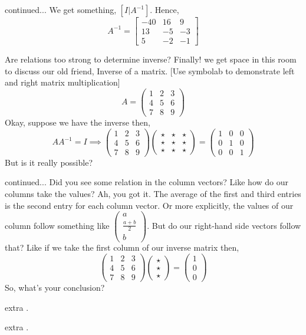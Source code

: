 \documentclass[11pt]{beamer}
\theoremstyle{plain}
\begin{document}
\begin{frame}{continued...}
    We get something, $[I|A^{-1}]$. 
    Hence, $$A^{-1}=\left[\begin{array}{ccc}
        -40&16&9\\
        13&-5&-3\\
        5&-2&-1
\end{array}\right]$$
\end{frame}
\begin{frame}{Are relations too strong to determine inverse?}
Finally! we get space in this room to discuss our old friend, Inverse of a matrix. [Use symbolab to demonstrate left and right matrix multiplication]
$$
A=\begin{pmatrix}
    1&2&3\\
    4&5&6\\
    7&8&9
\end{pmatrix}
$$
Okay, suppose we have the inverse then,
$$
AA^{-1}=I\implies\begin{pmatrix}
    1&2&3\\
    4&5&6\\
    7&8&9
\end{pmatrix}\begin{pmatrix}
    \star&\star&\star\\
    \star&\star&\star\\
    \star&\star&\star
\end{pmatrix}=\begin{pmatrix}
    1&0&0\\
    0&1&0\\
    0&0&1
\end{pmatrix}
$$
But is it really possible?
\end{frame}
\begin{frame}{continued...}
Did you see some relation in the column vectors? Like how do our columns take the values? Ah, you got it. The average of the first and third entries is the second entry for each column vector. Or more explicitly, the values of our column follow something like $\begin{pmatrix}
    a\\ \frac{a+b}{2}\\b
\end{pmatrix}$. But do our right-hand side vectors follow that? Like if we take the first column of our inverse matrix then,
$$
\begin{pmatrix}
    1&2&3\\
    4&5&6\\
    7&8&9
\end{pmatrix}\begin{pmatrix}
    \star\\
    \star\\
    \star
\end{pmatrix}=\begin{pmatrix}
    1\\0\\0
\end{pmatrix}
$$
So, what's your conclusion?
\end{frame}
\begin{frame}{extra}
    .
\end{frame}
\begin{frame}{extra}
    .
\end{frame}
\end{document}
